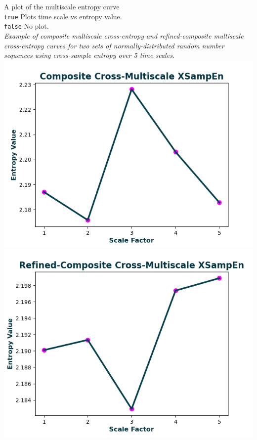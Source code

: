 \documentclass[12pt, a4paper, titlepage, openany]{book}
\begin{document}
\begin{description}[labelsep=1cm, labelwidth=2cm, nosep, style=multiline,leftmargin=3cm]
\item[\texttt{Plotx}]		A plot of the multiscale entropy curve\\
							\texttt{true} \hspace{15pt} Plots time scale vs entropy value.\\
							\texttt{false}\hspace{12pt} No plot.\\
							\textit{Example of composite multiscale cross-entropy and refined-composite multiscale cross-entropy curves for two sets of normally-distributed random number sequences using cross-sample entropy over 5 time scales.}\\
							\includegraphics[scale=.65]{cXMSEn1.png}\\
							\includegraphics[scale=.65]{rcXMSEn1.png}
\end{description}
\end{document}
